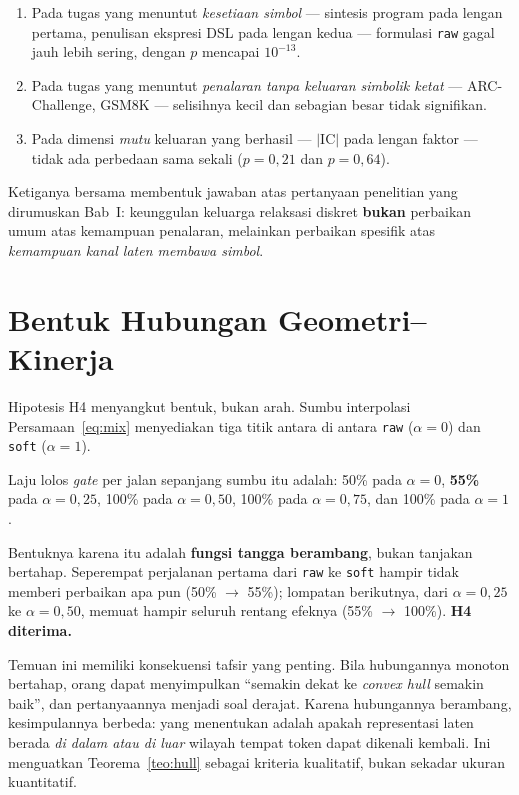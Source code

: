 \documentclass{laporanta1statugm}
\newcommand{\code}[1]{\texttt{#1}}
\begin{document}
\begin{enumerate}
  \item Pada tugas yang menuntut \emph{kesetiaan simbol} --- sintesis program
        pada lengan pertama, penulisan ekspresi DSL pada lengan kedua ---
        formulasi \code{raw} gagal jauh lebih sering, dengan $p$ mencapai
        $10^{-13}$.
  \item Pada tugas yang menuntut \emph{penalaran tanpa keluaran simbolik ketat}
        --- ARC-Challenge, GSM8K --- selisihnya kecil dan sebagian besar tidak
        signifikan.
  \item Pada dimensi \emph{mutu} keluaran yang berhasil --- $\lvert
        \mathrm{IC}\rvert$ pada lengan faktor --- tidak ada perbedaan sama
        sekali ($p = 0{,}21$ dan $p = 0{,}64$).
\end{enumerate}

Ketiganya bersama membentuk jawaban atas pertanyaan penelitian yang dirumuskan
Bab~I: keunggulan keluarga relaksasi diskret \textbf{bukan} perbaikan umum atas
kemampuan penalaran, melainkan perbaikan spesifik atas \emph{kemampuan kanal
laten membawa simbol}.

\section{Bentuk Hubungan Geometri--Kinerja}

Hipotesis H4 menyangkut bentuk, bukan arah. Sumbu interpolasi
Persamaan~\eqref{eq:mix} menyediakan tiga titik antara di antara \code{raw}
($\alpha = 0$) dan \code{soft} ($\alpha = 1$).

Laju lolos \textit{gate} per jalan sepanjang sumbu itu adalah: 50\% pada
$\alpha = 0$, \textbf{55\%} pada $\alpha = 0{,}25$, 100\% pada
$\alpha = 0{,}50$, 100\% pada $\alpha = 0{,}75$, dan 100\% pada $\alpha = 1$.

Bentuknya karena itu adalah \textbf{fungsi tangga berambang}, bukan tanjakan
bertahap. Seperempat perjalanan pertama dari \code{raw} ke \code{soft} hampir
tidak memberi perbaikan apa pun (50\% $\to$ 55\%); lompatan berikutnya, dari
$\alpha = 0{,}25$ ke $\alpha = 0{,}50$, memuat hampir seluruh rentang efeknya
(55\% $\to$ 100\%). \textbf{H4 diterima.}

Temuan ini memiliki konsekuensi tafsir yang penting. Bila hubungannya monoton
bertahap, orang dapat menyimpulkan ``semakin dekat ke \textit{convex hull}
semakin baik'', dan pertanyaannya menjadi soal derajat. Karena hubungannya
berambang, kesimpulannya berbeda: yang menentukan adalah apakah representasi
laten berada \emph{di dalam atau di luar} wilayah tempat token dapat dikenali
kembali. Ini menguatkan Teorema~\ref{teo:hull} sebagai kriteria kualitatif,
bukan sekadar ukuran kuantitatif.
\end{document}
